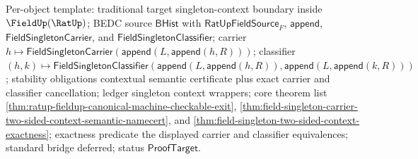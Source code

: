 
Per-object template: traditional target singleton-context boundary inside
$\FieldUp(\RatUp)$; BEDC source $\mathsf{BHist}$ with
$\mathsf{RatUpFieldSource}_F$, $\mathsf{append}$,
$\mathsf{FieldSingletonCarrier}$, and $\mathsf{FieldSingletonClassifier}$;
carrier
$h\mapsto\mathsf{FieldSingletonCarrier}(\mathsf{append}(L,\mathsf{append}(h,R)))$;
classifier
$(h,k)\mapsto\mathsf{FieldSingletonClassifier}
(\mathsf{append}(L,\mathsf{append}(h,R)),
\mathsf{append}(L,\mathsf{append}(k,R)))$; stability obligations contextual
semantic certificate plus exact carrier and classifier cancellation; ledger
singleton context wrappers; core theorem list
\autoref{thm:ratup-fieldup-canonical-machine-checkable-exit},
\autoref{thm:field-singleton-carrier-two-sided-context-semantic-namecert}, and
\autoref{thm:field-singleton-two-sided-context-exactness}; exactness predicate
the displayed carrier and classifier equivalences; standard bridge deferred;
status $\mathsf{ProofTarget}$.

